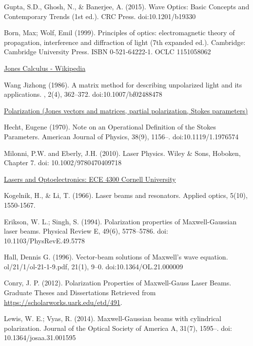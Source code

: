 \documentclass[11pt,a4paper]{article}
\numberwithin{equation}{section}
\begin{document}
\begin{thebibliography}{999}
	Gupta, S.D., Ghosh, N., \& Banerjee, A. (2015). Wave Optics: Basic Concepts and Contemporary Trends (1st ed.). CRC Press. doi:10.1201/b19330
	
	Born, Max; Wolf, Emil (1999). Principles of optics: electromagnetic theory of propagation, interference and diffraction of light (7th expanded ed.). Cambridge: Cambridge University Press. ISBN 0-521-64222-1. OCLC 1151058062
	
	\href{https://en.wikipedia.org/wiki/Jones_calculus}{Jones Calculus - Wikipedia}
	
	Wang Jizhong (1986). A matrix method for describing unpolarized light and its applications. , 2(4), 362–372. doi:10.1007/bf02488478
	
	\href{https://www.youtube.com/watch?v=RowMxWt4mVE&list=LL&index=5}{Polarization (Jones vectors and matrices, partial polarization, Stokes parameters)}
	
	Hecht, Eugene (1970). Note on an Operational Definition of the Stokes Parameters. American Journal of Physics, 38(9), 1156–. doi:10.1119/1.1976574    
	
	Milonni, P.W. and Eberly, J.H. (2010). Laser Physics. Wiley \& Sons, Hoboken, Chapter 7. doi: 10.1002/9780470409718
	
	\href{https://www.youtube.com/playlist?list=PLyWzPf87clvEb8T3Xf30tMaUqdbVchrNY}{Lasers and Optoelectronics: ECE 4300 Cornell University} 
	
	Kogelnik, H., \& Li, T. (1966). Laser beams and resonators. Applied optics, 5(10), 1550-1567. 
	
	Erikson, W. L.; Singh, S. (1994). Polarization properties of Maxwell-Gaussian laser beams. Physical Review E, 49(6), 5778–5786. doi: 10.1103/PhysRevE.49.5778
	
	Hall, Dennis G. (1996). Vector-beam solutions of Maxwell’s wave equation. ol/21/1/ol-21-1-9.pdf, 21(1), 9–0. doi:10.1364/OL.21.000009  
	
	Conry, J. P. (2012). Polarization Properties of Maxwell-Gauss Laser Beams. Graduate Theses and Dissertations Retrieved from \href{https://scholarworks.uark.edu/etd/491}{https://scholarworks.uark.edu/etd/491}.
	
	 Lewis, W. E.; Vyas, R. (2014). Maxwell-Gaussian beams with cylindrical polarization. Journal of the Optical Society of America A, 31(7), 1595–. doi: 10.1364/josaa.31.001595 
	

\end{thebibliography}
\end{document}
